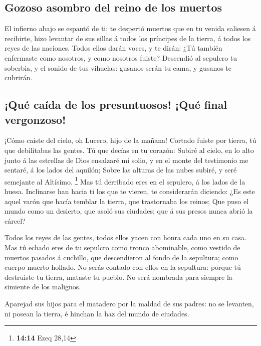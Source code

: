 \hypertarget{gozoso-asombro-del-reino-de-los-muertos}{%
\subsection{Gozoso asombro del reino de los
muertos}\label{gozoso-asombro-del-reino-de-los-muertos}}

 El infierno abajo se espantó de ti; te despertó muertos
que en tu venida saliesen á recibirte, hizo levantar de sus sillas á
todos los príncipes de la tierra, á todos los reyes de las naciones.
 Todos ellos darán voces, y te dirán: ¿Tú también
enfermaste como nosotros, y como nosotros fuiste? 
Descendió al sepulcro tu soberbia, y el sonido de tus vihuelas: gusanos
serán tu cama, y gusanos te cubrirán.

\hypertarget{quuxe9-cauxedda-de-los-presuntuosos-quuxe9-final-vergonzoso}{%
\subsection{¡Qué caída de los presuntuosos! ¡Qué final
vergonzoso!}\label{quuxe9-cauxedda-de-los-presuntuosos-quuxe9-final-vergonzoso}}

 ¡Cómo caiste del cielo, oh Lucero, hijo de la mañana!
Cortado fuiste por tierra, tú que debilitabas las gentes.
 Tú que decías en tu corazón: Subiré al cielo, en lo alto
junto á las estrellas de Dios ensalzaré mi solio, y en el monte del
testimonio me sentaré, á los lados del aquilón;  Sobre
las alturas de las nubes subiré, y seré semejante al Altísimo.
\footnote{\textbf{14:14} Ezeq 28,14}  Mas tú derribado
eres en el sepulcro, á los lados de la huesa.  Inclinarse
han hacia ti los que te vieren, te considerarán diciendo: ¿Es este aquel
varón que hacía temblar la tierra, que trastornaba los reinos;
 Que puso el mundo como un desierto, que asoló sus
ciudades; que á sus presos nunca abrió la cárcel?

 Todos los reyes de las gentes, todos ellos yacen con
honra cada uno en su casa.  Mas tú echado eres de tu
sepulcro como tronco abominable, como vestido de muertos pasados á
cuchillo, que descendieron al fondo de la sepultura; como cuerpo muerto
hollado.  No serás contado con ellos en la sepultura:
porque tú destruiste tu tierra, mataste tu pueblo. No será nombrada para
siempre la simiente de los malignos.

 Aparejad sus hijos para el matadero por la maldad de sus
padres: no se levanten, ni posean la tierra, é hinchan la haz del mundo
de ciudades.

